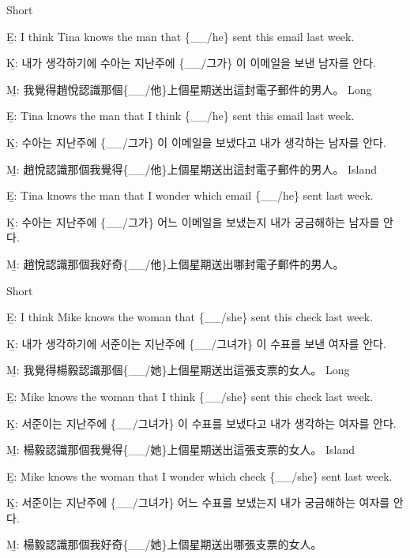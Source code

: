 \pex %
\a Short\par\nobreak
\beginsubsub
\b{E:} I think Tina knows the man that \{\_\_/he\} sent this email last week.\par\nobreak
\b{K:} \ko 내가 생각하기에 수아는 지난주에 \{\_\_/그가\} 이 이메일을 보낸 남자를 안다. \normalfont\par\nobreak
\b{M:} \zh 我覺得趙悅認識那個\{\_\_/他\}上個星期送出這封電子郵件的男人。 \normalfont
\endsubsub
\a Long\par\nobreak
\beginsubsub
\b{E:} Tina knows the man that I think \{\_\_/he\} sent this email last week.\par\nobreak
\b{K:} \ko 수아는 지난주에 \{\_\_/그가\} 이 이메일을 보냈다고 내가 생각하는 남자를 안다. \normalfont\par\nobreak
\b{M:} \zh 趙悅認識那個我覺得\{\_\_/他\}上個星期送出這封電子郵件的男人。 \normalfont
\endsubsub
\a Island\par\nobreak
\beginsubsub
\b{E:} Tina knows the man that I wonder which email \{\_\_/he\} sent last week.\par\nobreak
\b{K:} \ko 수아는 지난주에 \{\_\_/그가\} 어느 이메일을 보냈는지 내가 궁금해하는 남자를 안다\normalfont.\par\nobreak
\b{M:} \zh 趙悅認識那個我好奇\{\_\_/他\}上個星期送出哪封電子郵件的男人。\normalfont
\endsubsub
\xe

\pex %
\a Short\par\nobreak
\beginsubsub
\b{E:} I think Mike knows the woman that \{\_\_/she\} sent this check last week.\par\nobreak
\b{K:} \ko 내가 생각하기에 서준이는 지난주에 \{\_\_/그녀가\} 이 수표를 보낸 여자를 안다. \normalfont\par\nobreak
\b{M:} \zh 我覺得楊毅認識那個\{\_\_/她\}上個星期送出這張支票的女人。 \normalfont
\endsubsub
\a Long\par\nobreak
\beginsubsub
\b{E:} Mike knows the woman that I think \{\_\_/she\} sent this check last week.\par\nobreak
\b{K:} \ko 서준이는 지난주에 \{\_\_/그녀가\} 이 수표를 보냈다고 내가 생각하는 여자를 안다. \normalfont\par\nobreak
\b{M:} \zh 楊毅認識那個我覺得\{\_\_/她\}上個星期送出這張支票的女人。 \normalfont
\endsubsub
\a Island\par\nobreak
\beginsubsub
\b{E:} Mike knows the woman that I wonder which check \{\_\_/she\} sent last week.\par\nobreak
\b{K:} \ko 서준이는 지난주에 \{\_\_/그녀가\} 어느 수표를 보냈는지 내가 궁금해하는 여자를 안다\normalfont.\par\nobreak
\b{M:} \zh 楊毅認識那個我好奇\{\_\_/她\}上個星期送出哪張支票的女人。\normalfont
\endsubsub
\xe

